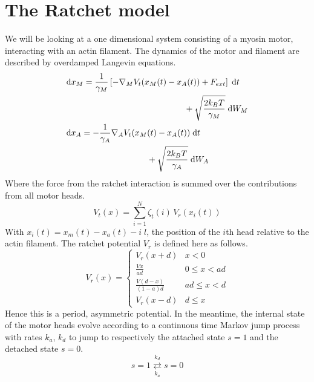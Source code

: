 \documentclass[aps,pre,twocolumn,showpacs,showkeys,a4paper]{revtex4}
\newcommand{\rmd}{{\mathrm d}}
\begin{document}
\section{The Ratchet model}
We will be looking at a one dimensional system consisting of a myosin motor, interacting with an actin filament. The dynamics of the motor and filament are described by overdamped Langevin equations. 
\begin{align}
&\begin{multlined}[b][.35\textwidth]
\rmd x_M = 
\frac{1}{\gamma_M} \left[ - \nabla_M V_t(x_M(t) - x_A(t)) + F_{ext} \right] \; \rmd t \\ 
+ \sqrt{ \frac{2 k_B T}{\gamma_M} } \; \rmd W_M 
\end{multlined}
\label{eom_M} \\
&\begin{multlined}[b][.35\textwidth]
\rmd x_A = 
- \frac{1}{\gamma_A} \nabla_A V_t(x_M(t) - x_A(t)) \; \rmd t \\
+ \sqrt{ \frac{2 k_B T}{\gamma_A} } \; \rmd W_A
\end{multlined}
\label{eom_A}
\end{align}
Where the force from the ratchet interaction is summed over the contributions from all motor heads.
\begin{equation}
V_t(x) = \sum_{i=1}^{N} \zeta_t(i) \, V_{r} (x_i(t))
\end{equation}
With $x_i(t) = x_{m}(t)-x_{a}(t) - i\;l$, the position of the $i$th head relative to the actin filament.
The ratchet potential $V_r$ is defined here as follows.
\begin{equation}
V_{r}(x) =  \begin{cases}
        V_r(x+d) & x < 0 \\[1ex] 
        \displaystyle \frac{ V x }{ a d } & 0 \leq x < a d \\[2ex]
        \displaystyle \frac{ V (d-x) }{ (1-a) d } & a d \leq x < d \\[2ex]
        V_r(x-d) & d \leq x  
   \end{cases}
   \label{rat_pot}
\end{equation}
Hence this is a period, asymmetric potential.
In the meantime, the internal state of the motor heads evolve according to a continuous time Markov jump process with rates $k_a$, $k_d$ to jump to respectively the attached state $s=1$ and the detached state $s=0$.
\begin{equation}
s = 1 \overset{k_d}{\underset{k_a}{\rightleftarrows}} s = 0
\end{equation}
\end{document}
